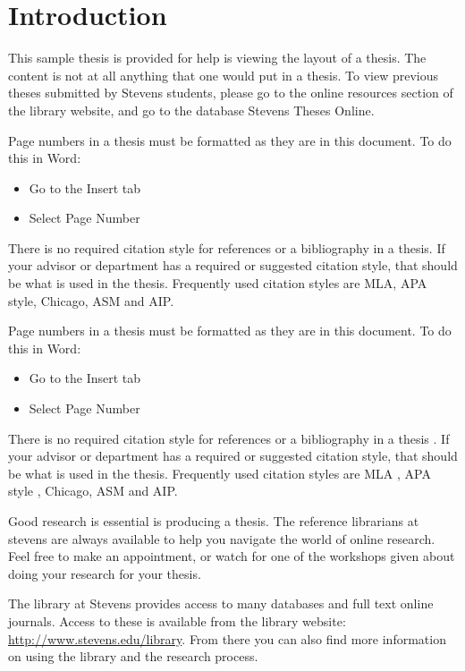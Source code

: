
\chapter{Introduction}
This sample thesis is provided for help is viewing the layout of a thesis.  The content is not at all anything that one would put in a thesis.  To view previous theses submitted by Stevens students, please go to the online resources section of the library website, and go to the database Stevens Theses Online.

Page numbers in a thesis must be formatted as they are in this document.
To do this in Word:
\begin{itemize}
    \item Go to the Insert tab
    \item Select Page Number
\end{itemize}

There is no required citation style for references or a bibliography in a thesis.  If your advisor or department has a required or suggested citation style, that should be what is used in the thesis.  Frequently used citation styles are MLA\cite{gibaldi_mla}, APA style\cite{APA}, Chicago, ASM and AIP.

Page numbers in a thesis must be formatted as they are in this document.
To do this in Word:
\begin{itemize}
    \item Go to the Insert tab
    \item Select Page Number
\end{itemize}

There is no required citation style for references or a bibliography in a thesis \cite{rabinowitz_manual_2009}.  If your advisor or department has a required or suggested citation style, that should be what is used in the thesis.  Frequently used citation styles are MLA \cite{gibaldi_mla}, APA style \cite{APA}, Chicago, ASM and AIP.


Good research is essential is producing a thesis.  The reference librarians at stevens are always available to help you navigate the world of online research.  Feel free to make an appointment, or watch for one of the workshops given about doing your research for your thesis.

The library at Stevens provides access to many databases and full text online journals.  Access to these is available from the library website:  \url{http://www.stevens.edu/library}.  From there you can also find more information on using the library and the research process.


